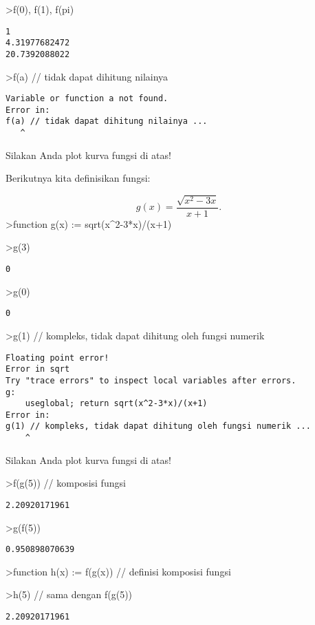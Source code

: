 \documentclass[
]{book}
\begin{document}
\textgreater f(0), f(1), f(pi)

\begin{verbatim}
1
4.31977682472
20.7392088022
\end{verbatim}

\textgreater f(a) // tidak dapat dihitung nilainya

\begin{verbatim}
Variable or function a not found.
Error in:
f(a) // tidak dapat dihitung nilainya ...
   ^
\end{verbatim}

Silakan Anda plot kurva fungsi di atas!

Berikutnya kita definisikan fungsi:

\[g(x)=\frac{\sqrt{x^2-3x}}{x+1}.\]\textgreater function g(x) := sqrt(x\^{}2-3*x)/(x+1)

\textgreater g(3)

\begin{verbatim}
0
\end{verbatim}

\textgreater g(0)

\begin{verbatim}
0
\end{verbatim}

\textgreater g(1) // kompleks, tidak dapat dihitung oleh fungsi numerik

\begin{verbatim}
Floating point error!
Error in sqrt
Try "trace errors" to inspect local variables after errors.
g:
    useglobal; return sqrt(x^2-3*x)/(x+1) 
Error in:
g(1) // kompleks, tidak dapat dihitung oleh fungsi numerik ...
    ^
\end{verbatim}

Silakan Anda plot kurva fungsi di atas!

\textgreater f(g(5)) // komposisi fungsi

\begin{verbatim}
2.20920171961
\end{verbatim}

\textgreater g(f(5))

\begin{verbatim}
0.950898070639
\end{verbatim}

\textgreater function h(x) := f(g(x)) // definisi komposisi fungsi

\textgreater h(5) // sama dengan f(g(5))

\begin{verbatim}
2.20920171961
\end{verbatim}
\end{document}
